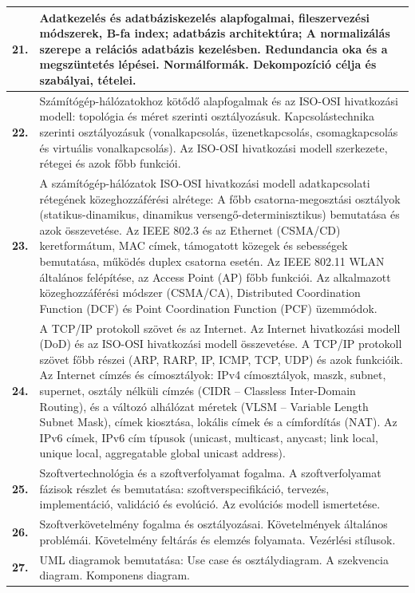 \documentclass[a4paper,12pt]{article}
\begin{document}
\begin{tabular}{|lp{16.5cm}|}
\textbf{21.} &
Adatkezelés és adatbáziskezelés alapfogalmai, fileszervezési módszerek, B-fa index; adatbázis architektúra; A normalizálás szerepe a relációs adatbázis kezelésben. Redundancia oka és a megszüntetés lépései. Normálformák. Dekompozíció célja és szabályai, tételei.
\\

\hline

\textbf{22.} &
Számítógép-hálózatokhoz kötődő alapfogalmak és az ISO-OSI hivatkozási modell: topológia és méret szerinti osztályozásuk. Kapcsolástechnika szerinti osztályozásuk (vonalkapcsolás, üzenetkapcsolás, csomagkapcsolás és virtuális vonalkapcsolás). Az ISO-OSI hivatkozási modell szerkezete, rétegei és azok főbb funkciói.
\\

\textbf{23.} &
A számítógép-hálózatok ISO-OSI hivatkozási modell adatkapcsolati rétegének közeghozzáférési alrétege: A főbb csatorna-megosztási osztályok (statikus-dinamikus, dinamikus versengő-determinisztikus) bemutatása és azok összevetése. Az IEEE 802.3 és az Ethernet (CSMA/CD) keretformátum, MAC címek, támogatott közegek és sebességek bemutatása, működés duplex csatorna esetén. Az IEEE 802.11 WLAN általános felépítése, az Access Point (AP) főbb funkciói. Az alkalmazott közeghozzáférési módszer (CSMA/CA), Distributed Coordination Function (DCF) és Point Coordination Function (PCF) üzemmódok.
\\

\textbf{24.} &
A TCP/IP protokoll szövet és az Internet. Az Internet hivatkozási modell (DoD) és az ISO-OSI hivatkozási modell összevetése. A TCP/IP protokoll szövet főbb részei (ARP, RARP, IP, ICMP, TCP, UDP) és azok funkcióik. Az Internet címzés és címosztályok: IPv4 címosztályok, maszk, subnet, supernet, osztály nélküli címzés (CIDR -- Classless Inter-Domain Routing), és a változó alhálózat méretek (VLSM -- Variable Length Subnet Mask), címek kiosztása, lokális címek és a címfordítás (NAT). Az IPv6 címek, IPv6 cím típusok (unicast, multicast, anycast; link local, unique local, aggregatable global unicast address).
\\

\hline

\textbf{25.} &
Szoftvertechnológia és a szoftverfolyamat fogalma. A szoftverfolyamat fázisok részlet és bemutatása: szoftverspecifikáció, tervezés, implementáció, validáció és evolúció. Az evolúciós modell ismertetése.
\\

\textbf{26.} &
Szoftverkövetelmény fogalma és osztályozásai. Követelmények általános problémái. Követelmény feltárás és elemzés folyamata. Vezérlési stílusok.
\\

\textbf{27.} &
UML diagramok bemutatása: Use case és osztálydiagram. A szekvencia diagram. Komponens diagram.
\\

\hline

\end{tabular}
\end{document}
